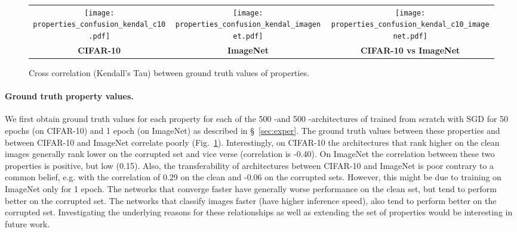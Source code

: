 \begin{figure}[tbhp]
	\centering
	\vspace{-10pt}
	\small
	\setlength{\tabcolsep}{0pt}
	\begin{tabular}{ccc}
		{\texttt{[image: properties\_confusion\_kendal\_c10.pdf]}} & {\texttt{[image: properties\_confusion\_kendal\_imagenet.pdf]}} &
		{\texttt{[image: properties\_confusion\_kendal\_c10\_imagenet.pdf]}}\\
		\textbf{CIFAR-10} & \textbf{ImageNet} & \textbf{CIFAR-10 vs ImageNet} \vspace{0pt}\\
	\end{tabular}
	\vspace{-5pt}
	\caption{Cross correlation (Kendall's Tau) between ground truth values of properties.}
	\label{fig:properties_cross}
	\vspace{-5pt}
\end{figure}

\paragraph{Ground truth property values.} We first obtain ground truth values for each property for each of the 500 \iid-\iidval and 500 \iid-\iidtest architectures of \dataset trained from scratch with SGD for 50 epochs (on CIFAR-10) and 1 epoch (on ImageNet) as described in \S~\ref{sec:exper}. The ground truth values between these properties and between CIFAR-10 and ImageNet correlate poorly (Fig.~\ref{fig:properties_cross}). Interestingly, on CIFAR-10 the architectures that rank higher on the clean images generally rank lower on the corrupted set and vice verse (correlation is -0.40). On ImageNet the correlation between these two properties is positive, but low (0.15). Also, the transferability of architectures between CIFAR-10 and ImageNet is poor contrary to a common belief, e.g. with the correlation of 0.29 on the clean and -0.06 on the corrupted sets. However, this might be due to training on ImageNet only for 1 epoch. The networks that converge faster have generally worse performance on the clean set, but tend to perform better on the corrupted set. The networks that classify images faster (have higher inference speed), also tend to perform better on the corrupted set. Investigating the underlying reasons for these relationships as well as extending the set of properties would be interesting in future work.


